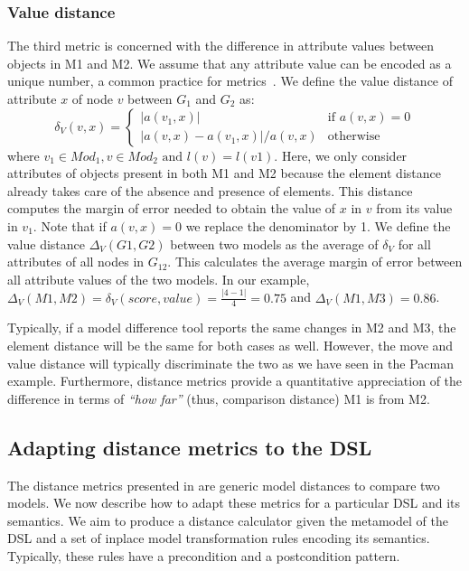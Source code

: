 \subsubsection{Value distance}
The third metric is concerned with the difference in attribute values between objects in M1 and M2.
We assume that any attribute value can be encoded as a unique number, a common practice for metrics~\cite{Bertoa2018}.
We define the value distance of attribute $x$ of node $v$ between $G_1$ and $G_2$ as:
\[
\delta_V(v,x)= \left\{
    \begin{array}{lr}
        |a(v_1,x)| & \mbox{if } a(v,x)=0   \\
        |a(v,x)-a(v_1,x)|/a(v,x) & \mbox{otherwise}
    \end{array}
    \right.
\]
where $v_1 \in Mod_1, v \in Mod_2 \mbox{ and } l(v)=l(v1)$.
Here, we only consider attributes of objects present in both M1 and M2 because the element distance already takes care of the absence and presence of elements.
This distance computes the margin of error needed to obtain the value of $x$ in $v$ from its value in $v_1$.
Note that if $a(v,x)=0$ we replace the denominator by 1.
We define the value distance $\Delta_V(G1,G2)$ between two models as the average of $\delta_V$ for all attributes of all nodes in $G_{12}$.
This calculates the average margin of error between all attribute values of the two models.
In our example, $\Delta_V(M1,M2)=\delta_V(score,value)=\frac{|4-1|}{4}=0.75$ and $\Delta_V(M1,M3)=0.86$.

Typically, if a model difference tool reports the same changes in M2 and M3, the element distance will be the same for both cases as well.
However, the move and value distance will typically discriminate the two as we have seen in the Pacman example.
Furthermore, distance metrics provide a quantitative appreciation of the difference in terms of \emph{``how far''} (thus, comparison distance) M1 is from M2.


\subsection{Adapting distance metrics to the DSL}\label{sec:adapt}

The distance metrics presented in  are generic model distances to compare two models.
We now describe how to adapt these metrics for a particular DSL and its semantics.
We aim to produce a distance calculator given the metamodel of the DSL and a set of inplace model transformation rules encoding its semantics.
Typically, these rules have a precondition and a postcondition pattern.

